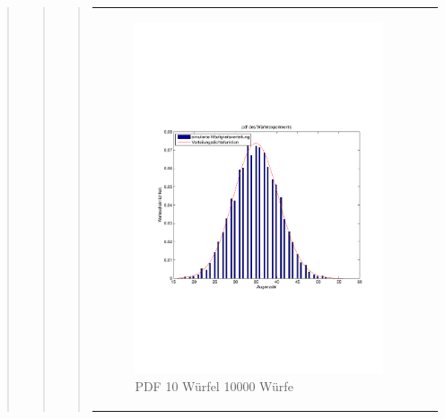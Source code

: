 \begin{quote}
\begin{quote}
\begin{quote}
            \begin{center}
            \begin{tabular}{ll}

            \hspace{-14em}
                \begin{minipage}{0.6\textwidth}

                    \begin{figure}[H]
                        \label{fig:}
                        \includegraphics[scale=0.5, trim = 2cm 6.5cm 1.5cm 8.5cm, clip]{./Bilder/10wuerfelpdf} %
                        \caption{PDF 10 Würfel 10000 Würfe}
                    \end{figure}

                \end{minipage}
                \begin{minipage}{0.6\textwidth}


\end{minipage}
\end{tabular}
\end{center}
\end{quote}
\end{quote}
\end{quote}
